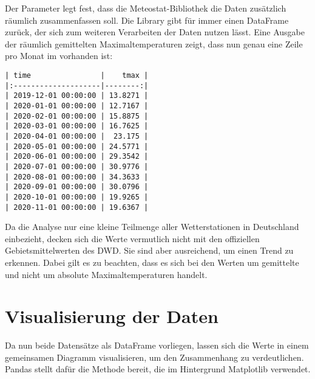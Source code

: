 

\medskip


Der Parameter  legt fest, dass die Meteostat-Bibliothek die Daten zusätzlich räumlich zusammenfassen soll. Die Library gibt für  immer einen DataFrame zurück, der sich zum weiteren Verarbeiten der Daten nutzen lässt. Eine Ausgabe der räumlich gemittelten Maximaltemperaturen zeigt, dass nun genau eine Zeile pro Monat im  vorhanden ist:

\medskip

\begin{lstlisting}
| time                |    tmax |
|:--------------------|--------:|
| 2019-12-01 00:00:00 | 13.8271 |
| 2020-01-01 00:00:00 | 12.7167 |
| 2020-02-01 00:00:00 | 15.8875 |
| 2020-03-01 00:00:00 | 16.7625 |
| 2020-04-01 00:00:00 |  23.175 |
| 2020-05-01 00:00:00 | 24.5771 |
| 2020-06-01 00:00:00 | 29.3542 |
| 2020-07-01 00:00:00 | 30.9776 |
| 2020-08-01 00:00:00 | 34.3633 |
| 2020-09-01 00:00:00 | 30.0796 |
| 2020-10-01 00:00:00 | 19.9265 |
| 2020-11-01 00:00:00 | 19.6367 |
\end{lstlisting}

\medskip


Da die Analyse nur eine kleine Teilmenge aller Wetterstationen in Deutschland einbezieht, decken sich die Werte vermutlich nicht mit den offiziellen Gebietsmittelwerten des DWD. Sie sind aber ausreichend, um einen Trend zu erkennen. Dabei gilt es zu beachten, dass es sich bei den Werten um gemittelte und nicht um absolute Maximaltemperaturen handelt.

\section{Visualisierung der Daten}

Da nun beide Datensätze als DataFrame vorliegen, lassen sich die Werte in einem gemeinsamen Diagramm visualisieren, um den Zusammenhang zu verdeutlichen. Pandas stellt dafür die Methode  bereit, die im Hintergrund Matplotlib verwendet.

\medskip



\PYTHON{}

